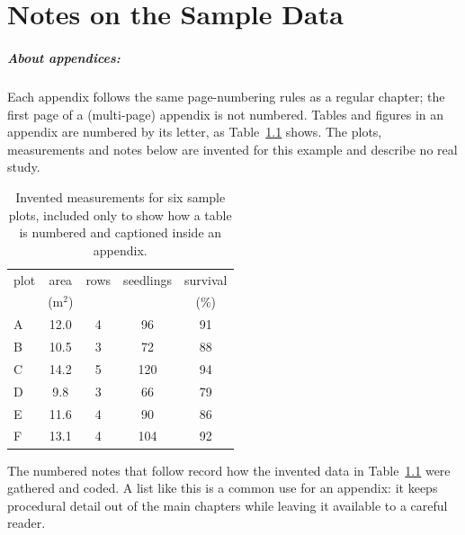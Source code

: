 \chapter{Notes on the Sample Data}	%

\paragraph{About appendices:}
	Each appendix follows the same page-numbering rules
	as a regular chapter; the first page of a
	(multi-page) appendix is not numbered.
	Tables and figures in an appendix are numbered
	by its letter, as Table~\ref{plottable} shows.
	The plots, measurements and notes below are
	invented for this example and describe no real study.

\begin{table}[htb]
    \caption[Invented measurements for six sample plots]{
	Invented measurements for six sample plots, included
	only to show how a table is numbered and captioned
	inside an appendix.
	}
    \begin{center}
    \begin{tabular}{||l|c|c|c|c||} \hline
	plot & area & rows & seedlings & survival \\
	     & (m$^2$) &   &           & (\%) \\  \hline \hline
	A  & 12.0 & 4 & 96  & 91 \\ \hline
	B  & 10.5 & 3 & 72  & 88 \\ \hline
	C  & 14.2 & 5 & 120 & 94 \\ \hline
	D  &  9.8 & 3 & 66  & 79 \\ \hline
	E  & 11.6 & 4 & 90  & 86 \\ \hline
	F  & 13.1 & 4 & 104 & 92 \\ \hline
	\end{tabular}
    \end{center}
\label{plottable}
\end{table}

The numbered notes that follow record how the invented
data in Table~\ref{plottable} were gathered and coded.
A list like this is a common use for an appendix: it
keeps procedural detail out of the main chapters while
leaving it available to a careful reader.

